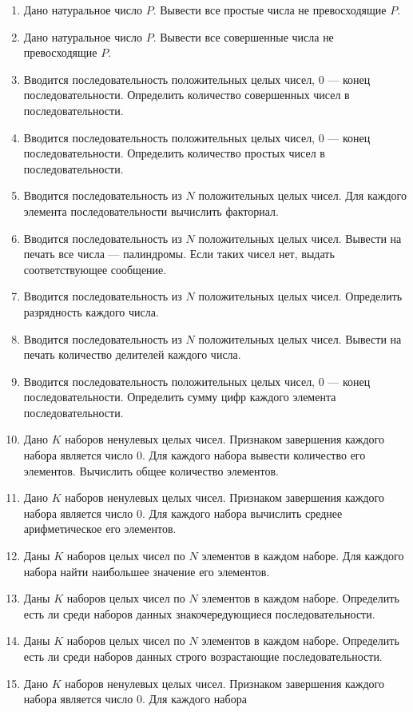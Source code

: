 \begin{enumerate}
\item Дано натуральное число $P$. Вывести все простые числа не
превосходящие $P$.
\item Дано натуральное число $P$. Вывести все совершенные числа не превосходящие
$P$.
\item Вводится последовательность положительных целых чисел, 0 --- конец последовательности. Определить количество
совершенных чисел в последовательности.
\item Вводится последовательность положительных целых чисел, 0 --- конец последовательности. Определить количество простых
чисел в последовательности.
\item Вводится последовательность из $N$ положительных целых чисел. Для каждого элемента
последовательности вычислить факториал.
\item Вводится последовательность из $N$ положительных целых чисел. Вывести на печать все числа ---
палиндромы. Если таких чисел нет, выдать соответствующее сообщение.
\item Вводится последовательность из $N$ положительных целых чисел. Определить разрядность каждого
числа.
\item Вводится последовательность из $N$ положительных целых чисел. Вывести на печать количество
делителей каждого числа.
\item Вводится последовательность положительных целых чисел, 0 --- конец последовательности. Определить сумму цифр каждого
элемента последовательности.
\item Дано $K$ наборов ненулевых целых чисел. Признаком завершения каждого набора является число 0. Для каждого набора
вывести количество его элементов. Вычислить общее количество элементов.
\item Дано $K$ наборов ненулевых целых чисел. Признаком завершения каждого набора является число 0. Для каждого набора
вычислить среднее арифметическое его элементов.
\item Даны $K$ наборов целых чисел по $N$ элементов в каждом наборе. Для каждого набора найти наибольшее значение его
элементов.
\item Даны $K$ наборов целых чисел по $N$ элементов в каждом наборе. Определить есть ли среди наборов данных
знакочередующиеся последовательности.
\item Даны $K$ наборов целых чисел по $N$ элементов в каждом наборе. Определить есть ли среди наборов данных строго
возрастающие последовательности.
\item Дано $K$ наборов ненулевых целых чисел. Признаком завершения каждого набора является число 0. Для каждого набора

\end{enumerate}
